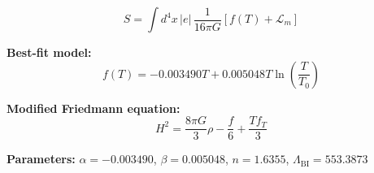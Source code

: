 
\begin{equation}
  S = \int d^4x \, |e| \, \frac{1}{16\pi G} \left[ f(T) + \mathcal{L}_m \right]
\end{equation}

\textbf{Best-fit model:}
\begin{equation}
  f(T) = -0.003490 T + 0.005048 T \ln\!\left(\frac{T}{T_0}\right)
\end{equation}

\textbf{Modified Friedmann equation:}
\begin{equation}
  H^2 = \frac{8\pi G}{3} \rho - \frac{f}{6} + \frac{T f_T}{3}
\end{equation}

\textbf{Parameters:}
$\alpha = -0.003490$, \quad
$\beta = 0.005048$, \quad
$n = 1.6355$, \quad
$\Lambda_{\text{BI}} = 553.3873$